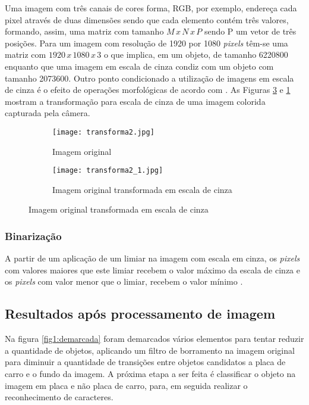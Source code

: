 Uma imagem com três canais de cores forma, RGB, por exemplo, endereça cada pixel através de duas dimensões sendo que cada elemento contém três valores, formando, assim, uma matriz com tamanho $M\,x\,N\,x\,P$ sendo P um vetor de três posições. Para um imagem com resolução de 1920 por 1080 \emph{pixels} têm-se uma matriz com $1920\,x\,1080\,x\,3$ o que implica, em um objeto, de tamanho 6220800 enquanto que uma imagem em escala de cinza condiz com um objeto com tamanho 2073600. Outro ponto condicionado a utilização de imagens em escala de cinza é o efeito de operações morfológicas de acordo com \cite{yepez2018improved}. As Figuras \ref{cinza} e \ref{original} mostram a transformação para escala de cinza de uma imagem colorida capturada pela câmera. 

\begin{figure}[H]
    \centering
     \begin{subfigure}{0.8\textwidth}
        \texttt{[image: transforma2.jpg]}
        \caption{Imagem original}
          \label{original}
      \end{subfigure}
        \hfill
      \begin{subfigure}{0.8\textwidth}
        \texttt{[image: transforma2\_1.jpg]}
        \caption{Imagem original transformada em escala de cinza}
          \label{cinza}
      \end{subfigure}
        \hfill
       
\end{figure} 


\subsubsection{Binarização}
A partir de um aplicação de um limiar na imagem com escala em cinza, os \emph{pixels} com valores maiores que este limiar recebem o valor máximo da escala de cinza e os \emph{pixels} com valor menor que o limiar, recebem o valor mínimo  \cite{gonzalez2007digital}.

\subsection{Resultados após processamento de imagem}


Na figura \ref{fig1:demarcada} foram demarcados vários elementos para tentar reduzir a quantidade de objetos, aplicando um filtro de borramento na imagem original para diminuir a quantidade de transições entre objetos candidatos a placa de carro e o fundo da imagem. A próxima etapa a ser feita é classificar o objeto na imagem em placa e não placa de carro, para, em seguida realizar o reconhecimento de caracteres.

